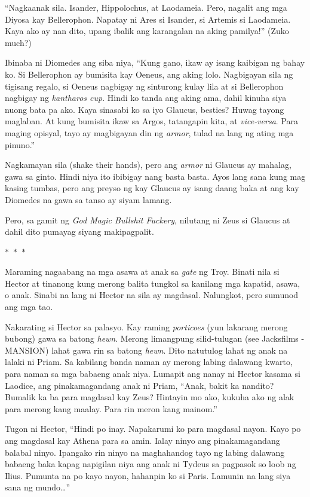 \documentclass[12pt,letterpaper]{report}
\newcommand{\seperate}{\begin{center}$\ast$~$\ast$~$\ast$\end{center}}
\begin{document}
``Nagkaanak sila. Isander, Hippolochus, at Laodameia. Pero, nagalit ang mga Diyosa kay Bellerophon. Napatay ni Ares si Isander, si Artemis si Laodameia. Kaya ako ay nan dito, upang ibalik ang karangalan na aking pamilya!'' (Zuko much?)

Ibinaba ni Diomedes ang siba niya, ``Kung gano, ikaw ay isang kaibigan ng bahay ko. Si Bellerophon ay bumisita kay Oeneus, ang aking lolo. Nagbigayan sila ng tigisang regalo, si Oeneus nagbigay ng sinturong kulay lila at si Bellerophon nagbigay ng \textit{kantharos cup}. Hindi ko tanda ang aking ama, dahil kinuha siya nuong bata pa ako. Kaya sinasabi ko sa iyo Glaucus, besties? Huwag tayong maglaban. At kung bumisita ikaw sa Argos, tatangapin kita, at \textit{vice-versa}. Para maging opisyal, tayo ay magbigayan din ng \textit{armor}, tulad na lang ng ating mga pinuno.''

Nagkamayan sila (shake their hands), pero ang \textit{armor} ni Glaucus ay mahalag, gawa sa ginto. Hindi niya ito ibibigay nang basta basta. Ayos lang sana kung mag kasing tumbas, pero ang preyso ng kay Glaucus ay isang daang baka at ang kay Diomedes na gawa sa tanso ay siyam lamang.

Pero, sa gamit ng \textit{God Magic Bullshit Fuckery}, nilutang ni Zeus si Glaucus at dahil dito pumayag siyang makipagpalit.

\seperate

Maraming nagaabang na mga asawa at anak sa \textit{gate} ng Troy. Binati nila si Hector at tinanong kung merong balita tungkol sa kanilang mga kapatid, asawa, o anak. Sinabi na lang ni Hector na sila ay magdasal. Nalungkot, pero sumunod ang mga tao.

Nakarating si Hector sa palasyo. Kay raming \textit{porticoes} (yun lakarang merong bubong) gawa sa batong \textit{hewn}. Merong limangpung silid-tulugan (see Jacksfilms - MANSION) lahat gawa rin sa batong \textit{hewn}. Dito natutulog lahat ng anak na lalaki ni Priam. Sa kabilang banda naman ay merong labing dalawang kwarto, para naman sa mga babaeng anak niya. Lumapit ang nanay ni Hector kasama si Laodice, ang pinakamagandang anak ni Priam, ``Anak, bakit ka nandito? Bumalik ka ba para magdasal kay Zeus? Hintayin mo ako, kukuha ako ng alak para merong kang maalay. Para rin meron kang mainom.''

Tugon ni Hector, ``Hindi po inay. Napakarumi ko para magdasal nayon. Kayo po ang magdasal kay Athena para sa amin. Ialay ninyo ang pinakamagandang balabal ninyo. Ipangako rin ninyo na maghahandog tayo ng labing dalawang babaeng baka kapag napigilan niya ang anak ni Tydeus sa pagpasok so loob ng Ilius. Pumunta na po kayo nayon, hahanpin ko si Paris. Lamunin na lang siya sana ng mundo\dots''
\end{document}
